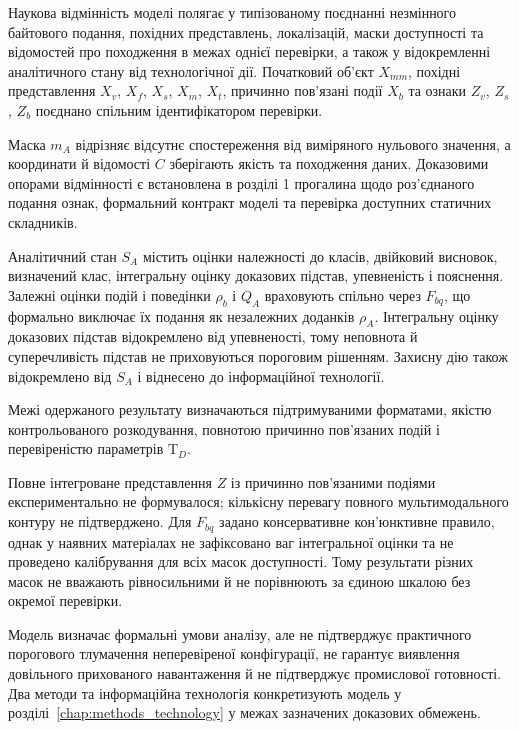 Наукова відмінність моделі полягає у типізованому поєднанні незмінного байтового подання, похідних представлень, локалізацій, маски доступності та відомостей про походження в межах однієї перевірки, а також у відокремленні аналітичного стану від технологічної дії. Початковий об’єкт $X_{mm}$, похідні представлення $X_v$, $X_f$, $X_s$, $X_m$, $X_t$, причинно пов’язані події $X_b$ та ознаки $Z_v$, $Z_s$, $Z_b$ поєднано спільним ідентифікатором перевірки.

Маска $m_A$ відрізняє відсутнє спостереження від виміряного нульового значення, а координати й відомості $C$ зберігають якість та походження даних. Доказовими опорами відмінності є встановлена в розділі 1 прогалина щодо роз’єднаного подання ознак, формальний контракт моделі та перевірка доступних статичних складників.

Аналітичний стан $S_A$ містить оцінки належності до класів, двійковий висновок, визначений клас, інтегральну оцінку доказових підстав, упевненість і пояснення. Залежні оцінки подій і поведінки $\rho_b$ і $Q_A$ враховують спільно через $F_{bq}$, що формально виключає їх подання як незалежних доданків $\rho_A$. Інтегральну оцінку доказових підстав відокремлено від упевненості, тому неповнота й суперечливість підстав не приховуються пороговим рішенням. Захисну дію також відокремлено від $S_A$ і віднесено до інформаційної технології.

Межі одержаного результату визначаються підтримуваними форматами, якістю контрольованого розкодування, повнотою причинно пов’язаних подій і перевіреністю параметрів $\mathrm T_D$.

Повне інтегроване представлення $Z$ із причинно пов’язаними подіями експериментально не формувалося; кількісну перевагу повного мультимодального контуру не підтверджено. Для $F_{bq}$ задано консервативне кон’юнктивне правило, однак у наявних матеріалах не зафіксовано ваг інтегральної оцінки та не проведено калібрування для всіх масок доступності. Тому результати різних масок не вважають рівносильними й не порівнюють за єдиною шкалою без окремої перевірки.

Модель визначає формальні умови аналізу, але не підтверджує практичного порогового тлумачення неперевіреної конфігурації, не гарантує виявлення довільного прихованого навантаження й не підтверджує промислової готовності. Два методи та інформаційна технологія конкретизують модель у розділі~\ref{chap:methods_technology} у межах зазначених доказових обмежень.
